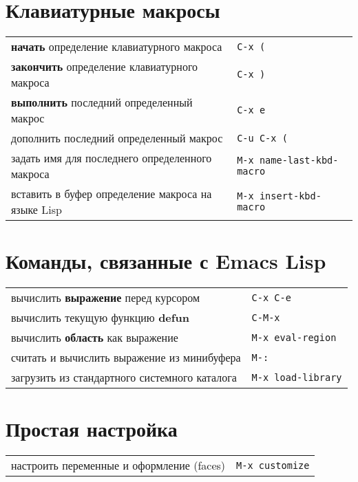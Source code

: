 \documentclass[10pt]{article}
\newlength{\ColWidth}
\newcommand{\kbd}[1]{\texttt{#1}}
\begin{document}
\section{Клавиатурные макросы}

\begin{tabular}{p{\ColWidth}l}
{\bf начать} определение клавиатурного макроса & \kbd{C-x (} \\
{\bf закончить} определение клавиатурного макроса & \kbd{C-x )} \\
{\bf выполнить} последний определенный макрос & \kbd{C-x e} \\
дополнить последний определенный макрос & \kbd{C-u C-x (} \\
задать имя для последнего определенного макроса & \kbd{M-x name-last-kbd-macro} \\
вставить в буфер определение макроса на языке Lisp & \kbd{M-x insert-kbd-macro} \\
\end{tabular}

\section{Команды, связанные с Emacs Lisp}

\begin{tabular}{p{\ColWidth}l}
вычислить {\bf выражение} перед курсором & \kbd{C-x C-e} \\
вычислить текущую функцию {\bf defun} & \kbd{C-M-x} \\
вычислить {\bf область} как выражение & \kbd{M-x eval-region} \\
считать и вычислить выражение из минибуфера & \kbd{M-:} \\
загрузить из стандартного системного каталога & \kbd{M-x load-library} \\
\end{tabular}

\section{Простая настройка}

\begin{tabular}{p{\ColWidth}l}
настроить переменные и оформление (faces) & \kbd{M-x customize} \\
\end{tabular}

\end{document}
